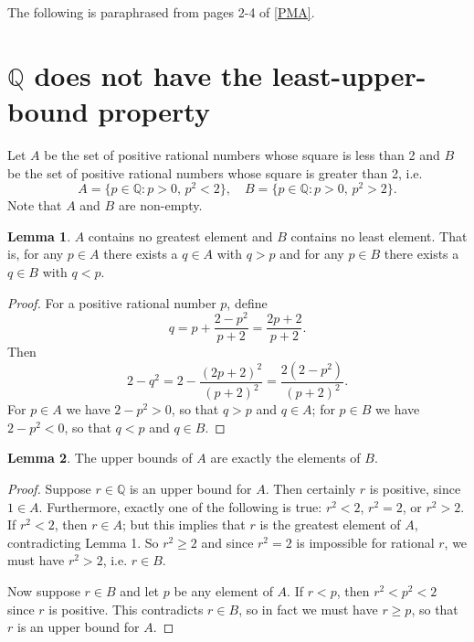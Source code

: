 \documentclass[12pt]{article}
\newcommand{\newp}{\vspace{5mm}}
\theoremstyle{definition}
\newtheorem{lemma}{Lemma}
\begin{document}
The following is paraphrased from pages 2-4 of \hyperlink{pma}{[PMA]}.

\section{\texorpdfstring{\( \mathbb{Q} \)}{} does not have the least-upper-bound property}

Let \( A \) be the set of positive rational numbers whose square is less than 2 and \( B \) be the set of positive rational numbers whose square is greater than 2, i.e.
\[ A = \{ p \in \mathbb{Q} : p > 0, \, p^2 < 2 \}, \quad B = \{ p \in \mathbb{Q} : p > 0, \, p^2 > 2 \}. \]
Note that \( A \) and \( B \) are non-empty.

\begin{lemma}

\( A \) contains no greatest element and \( B \) contains no least element. That is, for any \( p \in A \) there exists a \( q \in A \) with \( q > p \) and for any \( p \in B \) there exists a \( q \in B \) with \( q < p \).

\end{lemma}

\begin{proof}

For a positive rational number \( p \), define
\[ q = p + \frac{2 - p^2}{p + 2} = \frac{2p + 2}{p + 2}. \]
Then
\[ 2 - q^2 = 2 - \frac{(2p + 2)^2}{(p+2)^2} = \frac{2(2 - p^2)}{(p + 2)^2}. \]
For \( p \in A \) we have \( 2 - p^2 > 0 \), so that \( q > p \) and \( q \in A \); for \( p \in B \) we have \( 2 - p^2 < 0 \), so that \( q < p \) and \( q \in B \).
\end{proof}

\begin{lemma}

The upper bounds of \( A \) are exactly the elements of \( B \).

\end{lemma}

\begin{proof}

Suppose \( r \in \mathbb{Q} \) is an upper bound for \( A \). Then certainly \( r \) is positive, since \( 1 \in A \). Furthermore, exactly one of the following is true: \( r^2 < 2 \), \( r^2 = 2 \), or \( r^2 > 2 \). If \( r^2 < 2 \), then \( r \in A \); but this implies that \( r \) is the greatest element of \( A \), contradicting Lemma 1. So \( r^2 \geq 2 \) and since \( r^2 = 2 \) is impossible for rational \( r \), we must have \( r^2 > 2 \), i.e. \( r \in B \).

\newp

Now suppose \( r \in B \) and let \( p \) be any element of \( A \). If \( r < p \), then \( r^2 < p^2 < 2 \) since \( r \) is positive. This contradicts \( r \in B \), so in fact we must have \( r \geq p \), so that \( r \) is an upper bound for \( A \).
\end{proof}
\end{document}
